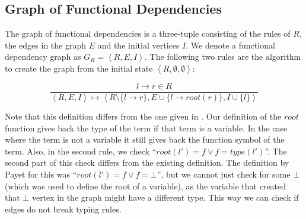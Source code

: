 \subsection*{Graph of Functional Dependencies}
The graph of functional dependencies is a three-tuple consisting of the rules of $R$, the edges in the graph $E$ and the initial vertices $I$. We denote a functional dependency graph as $G_R = \left< R, E, I \right>$. The following two rules are the algorithm to create the graph from the initial state $\left<R, \emptyset, \emptyset\right>$:
\begin{definition}
\label{def:gofd}
\[
\frac{l \rightarrow r \in R}{\left< R, E, I \right> \mapsto \left< R \setminus \{ l \rightarrow r\}, E \cup \{ l \rightarrow \textit{root}(r) \}, I \cup \{ l \} \right>}
\]
\begin{center}
\end{center}
\end{definition}
Note that this definition differs from the one given in \cite{Payet:Unfolding}. Our definition of the $\textit{root}$ function gives back the type of the term if that term is a variable. In the case where the term is not a variable it still gives back the function symbol of the term. Also, in the second rule, we check ``$\textit{root}(l') = f \lor f = \textit{type}(l')$''. The second part of this check differs from the existing definition. The definition by Payet for this was ``$\textit{root}(l') = f \lor f = \bot$'', but we cannot just check for some $\bot$ (which was used to define the root of a variable), as the variable that created that $\bot$ vertex in the graph might have a different type. This way we can check if edges do not break typing rules. 

